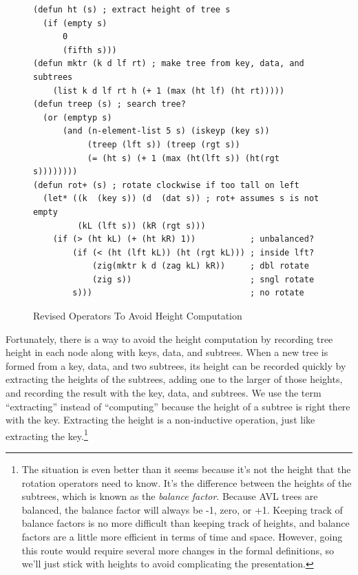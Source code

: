 \begin{figure}
\begin{center}
\begin{code}
\begin{verbatim}
(defun ht (s) ; extract height of tree s
  (if (empty s)
      0
      (fifth s)))
(defun mktr (k d lf rt) ; make tree from key, data, and subtrees
    (list k d lf rt h (+ 1 (max (ht lf) (ht rt)))))
(defun treep (s) ; search tree?
  (or (emptyp s)
      (and (n-element-list 5 s) (iskeyp (key s))
           (treep (lft s)) (treep (rgt s))
           (= (ht s) (+ 1 (max (ht(lft s)) (ht(rgt s))))))))
(defun rot+ (s) ; rotate clockwise if too tall on left
  (let* ((k  (key s)) (d  (dat s)) ; rot+ assumes s is not empty
         (kL (lft s)) (kR (rgt s)))
    (if (> (ht kL) (+ (ht kR) 1))           ; unbalanced?
        (if (< (ht (lft kL)) (ht (rgt kL))) ; inside lft?
            (zig(mktr k d (zag kL) kR))     ; dbl rotate
            (zig s))                        ; sngl rotate
        s)))                                ; no rotate
\end{verbatim}
\end{code}
\end{center}
\caption{Revised Operators To Avoid Height Computation}
\label{defun:balance-factor}
\end{figure}

Fortunately, there is a way to avoid the
height computation
by recording tree height
in each node along with keys, data, and subtrees.
When a new tree is formed from a key, data, and two subtrees,
its height can be recorded quickly by extracting the heights of the
subtrees, adding one to the larger of those heights,
and recording the result with the key, data, and subtrees.
We use the term ``extracting'' instead of ``computing''
because the height of a subtree is right there with the key.
Extracting the height is a non-inductive operation,
just like extracting the key.\footnote{The situation
is even better than it seems because
it's not the height that the rotation operators need to know.
It's the difference between the heights of the subtrees,
which is known as the \emph{balance factor}.
Because AVL trees are balanced,
the balance factor will always be
-1, zero, or +1.
Keeping track of balance factors is no more difficult
than keeping track of heights,
and balance factors are a little more
efficient in terms of time and space.
However, going this route would require several
more changes in the formal definitions,
so we'll just stick with heights to avoid complicating the presentation.}

